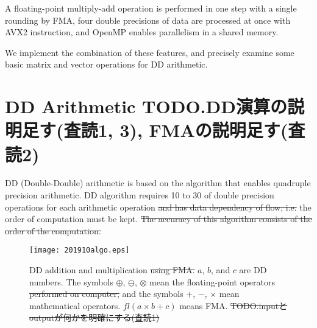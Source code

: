 \documentclass{IOS-Book-Article}
\begin{document}
A floating-point multiply-add operation is performed in one step with a single rounding by FMA, four double precisions of data are processed at once with AVX2 instruction, and OpenMP enables {\color{blue}{thread-level (refree3)}} parallelism in a shared memory. {\color{blue}{(Introductionで詳しい説明か、3節で詳しく述べるか)}}

We implement the combination of these features, and precisely examine some basic matrix and vector operations for DD arithmetic. 


\section{DD Arithmetic TODO.DD演算の説明足す(査読1, 3), FMAの説明足す(査読2)}
DD (Double-Double) arithmetic \cite{DD} is based on the algorithm that enables {\color{blue}{quasi (typo refree3)}} quadruple precision arithmetic.
{} 
DD algorithm requires 10 to 30 of double precision operations for each arithmetic operation\sout{ and has data dependency of flow, i.e.} {\color{mur}{and}} the order of computation must be kept. \sout{The accuracy of this algorithm consists of the order of the computation. }


\begin{figure}[htbp]
  \begin{center}
    \texttt{[image: 201910algo.eps]}
    \caption{DD addition and multiplication \sout{using FMA.} $a$, $b$, and $c$ are DD numbers. The symbols $\oplus$, $\ominus$, $\otimes$ mean the {\color{blue}{double precision}} floating-point operators \sout{performed on computer,} and the symbols $+$, $-$, $\times$ mean mathematical operators. $fl(a\times b+c)$ means FMA. \sout{TODO.inputとoutputが何かを明確にする(査読1)}}
\label{fig1}
  \end{center}
\end{figure}
\end{document}
